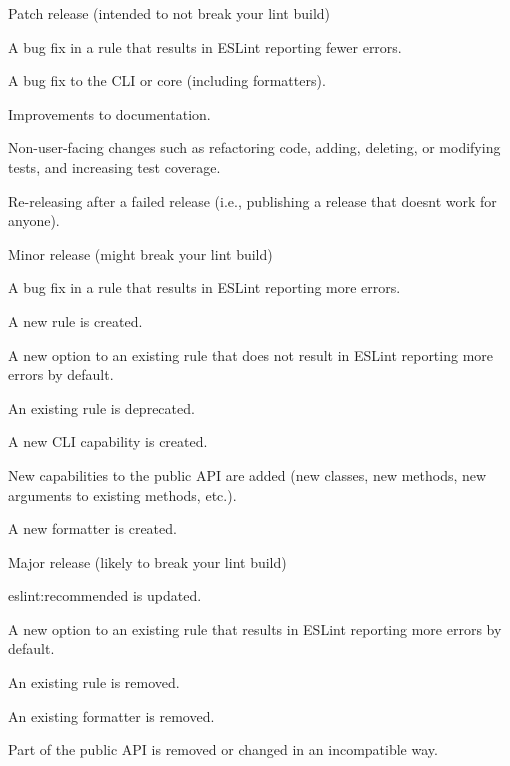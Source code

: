 \begin{DoxyItemize}
\item Patch release (intended to not break your lint build)
\begin{DoxyItemize}
\item A bug fix in a rule that results in E\+S\+Lint reporting fewer errors.
\item A bug fix to the C\+LI or core (including formatters).
\item Improvements to documentation.
\item Non-\/user-\/facing changes such as refactoring code, adding, deleting, or modifying tests, and increasing test coverage.
\item Re-\/releasing after a failed release (i.\+e., publishing a release that doesn\textquotesingle{}t work for anyone).
\end{DoxyItemize}
\item Minor release (might break your lint build)
\begin{DoxyItemize}
\item A bug fix in a rule that results in E\+S\+Lint reporting more errors.
\item A new rule is created.
\item A new option to an existing rule that does not result in E\+S\+Lint reporting more errors by default.
\item An existing rule is deprecated.
\item A new C\+LI capability is created.
\item New capabilities to the public A\+PI are added (new classes, new methods, new arguments to existing methods, etc.).
\item A new formatter is created.
\end{DoxyItemize}
\item Major release (likely to break your lint build)
\begin{DoxyItemize}
\item {\ttfamily eslint\+:recommended} is updated.
\item A new option to an existing rule that results in E\+S\+Lint reporting more errors by default.
\item An existing rule is removed.
\item An existing formatter is removed.
\item Part of the public A\+PI is removed or changed in an incompatible way.
\end{DoxyItemize}
\end{DoxyItemize}

